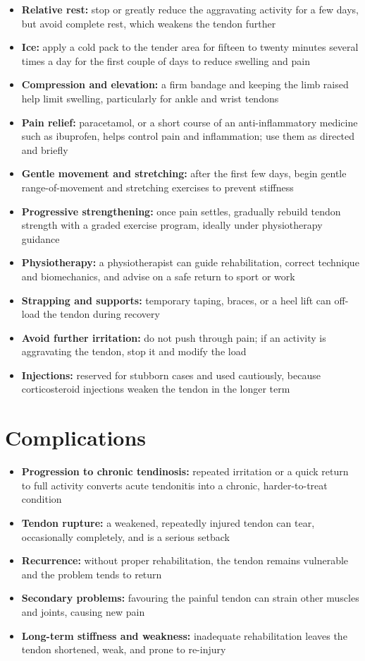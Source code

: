 \begin{itemize}
    \item \textbf{Relative rest:} stop or greatly reduce the aggravating activity for a few days, but avoid complete rest, which weakens the tendon further
    \item \textbf{Ice:} apply a cold pack to the tender area for fifteen to twenty minutes several times a day for the first couple of days to reduce swelling and pain
    \item \textbf{Compression and elevation:} a firm bandage and keeping the limb raised help limit swelling, particularly for ankle and wrist tendons
    \item \textbf{Pain relief:} paracetamol, or a short course of an anti-inflammatory medicine such as ibuprofen, helps control pain and inflammation; use them as directed and briefly
    \item \textbf{Gentle movement and stretching:} after the first few days, begin gentle range-of-movement and stretching exercises to prevent stiffness
    \item \textbf{Progressive strengthening:} once pain settles, gradually rebuild tendon strength with a graded exercise program, ideally under physiotherapy guidance
    \item \textbf{Physiotherapy:} a physiotherapist can guide rehabilitation, correct technique and biomechanics, and advise on a safe return to sport or work
    \item \textbf{Strapping and supports:} temporary taping, braces, or a heel lift can off-load the tendon during recovery
    \item \textbf{Avoid further irritation:} do not push through pain; if an activity is aggravating the tendon, stop it and modify the load
    \item \textbf{Injections:} reserved for stubborn cases and used cautiously, because corticosteroid injections weaken the tendon in the longer term
\end{itemize}

\section*{Complications}
\begin{itemize}
    \item \textbf{Progression to chronic tendinosis:} repeated irritation or a quick return to full activity converts acute tendonitis into a chronic, harder-to-treat condition
    \item \textbf{Tendon rupture:} a weakened, repeatedly injured tendon can tear, occasionally completely, and is a serious setback
    \item \textbf{Recurrence:} without proper rehabilitation, the tendon remains vulnerable and the problem tends to return
    \item \textbf{Secondary problems:} favouring the painful tendon can strain other muscles and joints, causing new pain
    \item \textbf{Long-term stiffness and weakness:} inadequate rehabilitation leaves the tendon shortened, weak, and prone to re-injury
\end{itemize}

